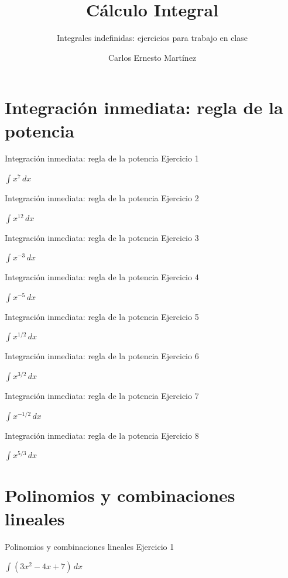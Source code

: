 \documentclass[10pt,aspectratio=169]{beamer}
\title{Cálculo Integral}
\subtitle{Integrales indefinidas: ejercicios para trabajo en clase}
\author{Carlos Ernesto Martínez}
\institute{Tecnológico Nacional de México}
\date{}
\newcommand{\ejercicio}[1]{%
  \begin{center}
  \vfill
  {\fontsize{24}{30}\selectfont #1}
  \vfill
  \end{center}
}
\begin{document}
\begin{frame}\titlepage\end{frame}
\section{Integración inmediata: regla de la potencia}
\begin{frame}{Integración inmediata: regla de la potencia}
\small Ejercicio 1
\ejercicio{$\displaystyle \int x^7\,dx$}
\end{frame}

\begin{frame}{Integración inmediata: regla de la potencia}
\small Ejercicio 2
\ejercicio{$\displaystyle \int x^{12}\,dx$}
\end{frame}

\begin{frame}{Integración inmediata: regla de la potencia}
\small Ejercicio 3
\ejercicio{$\displaystyle \int x^{-3}\,dx$}
\end{frame}

\begin{frame}{Integración inmediata: regla de la potencia}
\small Ejercicio 4
\ejercicio{$\displaystyle \int x^{-5}\,dx$}
\end{frame}

\begin{frame}{Integración inmediata: regla de la potencia}
\small Ejercicio 5
\ejercicio{$\displaystyle \int x^{1/2}\,dx$}
\end{frame}

\begin{frame}{Integración inmediata: regla de la potencia}
\small Ejercicio 6
\ejercicio{$\displaystyle \int x^{3/2}\,dx$}
\end{frame}

\begin{frame}{Integración inmediata: regla de la potencia}
\small Ejercicio 7
\ejercicio{$\displaystyle \int x^{-1/2}\,dx$}
\end{frame}

\begin{frame}{Integración inmediata: regla de la potencia}
\small Ejercicio 8
\ejercicio{$\displaystyle \int x^{5/3}\,dx$}
\end{frame}

\section{Polinomios y combinaciones lineales}
\begin{frame}{Polinomios y combinaciones lineales}
\small Ejercicio 1
\ejercicio{$\displaystyle \int(3x^2-4x+7)\,dx$}
\end{frame}
\end{document}
